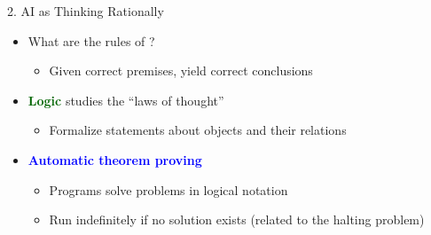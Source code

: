 \documentclass[
  10pt,
  ignorenonframetext,
]{beamer}
\providecommand{\tightlist}{%
  \setlength{\itemsep}{0pt}\setlength{\parskip}{0pt}}
\begin{document}
\begin{frame}{2. AI as Thinking Rationally}
\label{ai-as-thinking-rationally}
\begin{itemize}
\tightlist
\item
  What are the rules of
  \textbf{\textcolor{red}{\textcolor{black}{}}}?

  \begin{itemize}
  \tightlist
  \item
    Given correct premises, yield correct conclusions
  \end{itemize}
\item
  \textbf{\textcolor{darkgreen}{Logic}} studies the ``laws of thought''

  \begin{itemize}
  \tightlist
  \item
    Formalize statements about objects and their relations
  \end{itemize}
\item
  \textbf{\textcolor{blue}{Automatic theorem proving}}

  \begin{itemize}
  \tightlist
  \item
    Programs solve problems in logical notation
  \item
    Run indefinitely if no solution exists (related to the halting
    problem)
  \end{itemize}
\end{itemize}
\end{frame}
\end{document}
